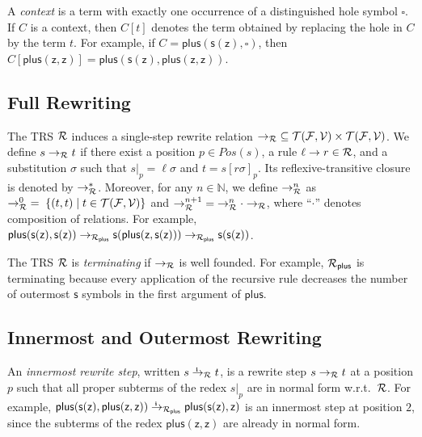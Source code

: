 A \emph{context} is a term with exactly one occurrence of a distinguished hole symbol $\square$.
If $C$ is a context, then $C[t]$ denotes the term obtained by replacing the hole in $C$ by the term $t$.
For example, if $C = \mathsf{plus}(\mathsf{s}(\mathsf{z}),\square)$, 
then $C[\mathsf{plus}(\mathsf{z},\mathsf{z})] = \mathsf{plus}(\mathsf{s}(\mathsf{z}),\mathsf{plus}(\mathsf{z},\mathsf{z}))$.

\subsection{Full Rewriting}

The TRS $\mathcal{R}$ induces a single-step rewrite relation ${\to_{\mathcal{R}}} \subseteq \mathcal{T}(\mathcal{F},\mathcal{V}) \times \mathcal{T}(\mathcal{F},\mathcal{V})$.
We define $s \to_{\mathcal{R}} t$ if there exist a position $p \in \mathit{Pos}(s)$, 
a rule $\ell \to r \in \mathcal{R}$, and a substitution $\sigma$ 
such that $s|_p = \ell\sigma$ and $t = s[r\sigma]_p$.
Its reflexive-transitive closure is denoted by $\to_{\mathcal{R}}^*$.
Moreover, for any $n \in \mathbb{N}$, we define $\to_{\mathcal{R}}^{n}$ as 
$\to_{\mathcal{R}}^{0} \;=\; \{(t,t) \mid t \in \mathcal{T}(\mathcal{F},\mathcal{V})\}$ and 
$\to_{\mathcal{R}}^{n+1} \;=\; \to_{\mathcal{R}}^{n} \cdot \to_{\mathcal{R}}$, 
where ``$\cdot$'' denotes composition of relations.
For example, $\mathsf{plus}(\mathsf{s}(\mathsf{z}),\mathsf{s}(\mathsf{z})) 
\to_{\mathcal{R}_{\mathsf{plus}}} \mathsf{s}(\mathsf{plus}(\mathsf{z},\mathsf{s}(\mathsf{z}))) 
\to_{\mathcal{R}_{\mathsf{plus}}} \mathsf{s}(\mathsf{s}(\mathsf{z}))$.

The TRS $\mathcal{R}$ is \emph{terminating} if $\to_{\mathcal{R}}$ is well founded.
For example, $\mathcal{R}_{\mathsf{plus}}$ is terminating because every application of 
the recursive rule decreases the number of outermost $\mathsf{s}$ symbols in the first argument of $\mathsf{plus}$.

\subsection{Innermost and Outermost Rewriting}

An \emph{innermost rewrite step}, written $s \ito_\Rules t$, is a rewrite step $s \to_{\mathcal{R}} t$ at a position $p$ 
such that all proper subterms of the redex $s|_p$ are in normal form w.r.t.\ $\mathcal{R}$.
For example, $\mathsf{plus}(\mathsf{s}(\mathsf{z}),\mathsf{plus}(\mathsf{z},\mathsf{z})) 
\ito_{\Rules_{\mathsf{plus}}} \mathsf{plus}(\mathsf{s}(\mathsf{z}),\mathsf{z})$
is an innermost step at position $2$, since the subterms of the redex $\mathsf{plus}(\mathsf{z},\mathsf{z})$ are already in normal form.

